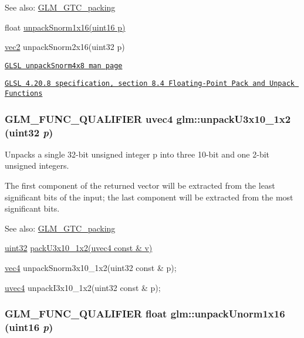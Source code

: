\begin{Desc}
\item[See also:]\hyperlink{group__gtc__packing}{GLM\_\-GTC\_\-packing} 

float \hyperlink{group__gtc__packing_g246f451cebf590726324f7a283e3d65e}{unpackSnorm1x16(uint16 p)} 

\hyperlink{group__core__types_ga1618f51db67eaa145db101d8c8431d8}{vec2} unpackSnorm2x16(uint32 p) 

\href{http://www.opengl.org/sdk/docs/manglsl/xhtml/unpackSnorm2x16.xml}{\tt GLSL unpackSnorm4x8 man page} 

\href{http://www.opengl.org/registry/doc/GLSLangSpec.4.20.8.pdf}{\tt GLSL 4.20.8 specification, section 8.4 Floating-Point Pack and Unpack Functions} \end{Desc}
\hypertarget{group__gtc__packing_g119aa2d7d55952f9dc4214390a6ffefc}{
\subsubsection[unpackU3x10\_\-1x2]{\setlength{\rightskip}{0pt plus 5cm}GLM\_\-FUNC\_\-QUALIFIER uvec4 glm::unpackU3x10\_\-1x2 (uint32 {\em p})}}
\label{group__gtc__packing_g119aa2d7d55952f9dc4214390a6ffefc}


Unpacks a single 32-bit unsigned integer p into three 10-bit and one 2-bit unsigned integers.

The first component of the returned vector will be extracted from the least significant bits of the input; the last component will be extracted from the most significant bits.

\begin{Desc}
\item[See also:]\hyperlink{group__gtc__packing}{GLM\_\-GTC\_\-packing} 

\hyperlink{group__gtc__type__precision_g202b6a53c105fcb7e531f9b443518451}{uint32} \hyperlink{group__gtc__packing_gf656d8862628f96b20de7a36eaa1fe56}{packU3x10\_\-1x2(uvec4 const \& v)} 

\hyperlink{group__core__types_g5881b1b022d7fd1b7218f5916532dd02}{vec4} unpackSnorm3x10\_\-1x2(uint32 const \& p); 

\hyperlink{group__core__types_g1c426d19627b32b14f0089f7f4ba7b1d}{uvec4} unpackI3x10\_\-1x2(uint32 const \& p); \end{Desc}
\hypertarget{group__gtc__packing_g7770e3ade4f4764cc1b2eb42ac4ec188}{
\subsubsection[unpackUnorm1x16]{\setlength{\rightskip}{0pt plus 5cm}GLM\_\-FUNC\_\-QUALIFIER float glm::unpackUnorm1x16 (uint16 {\em p})}}
\label{group__gtc__packing_g7770e3ade4f4764cc1b2eb42ac4ec188}


